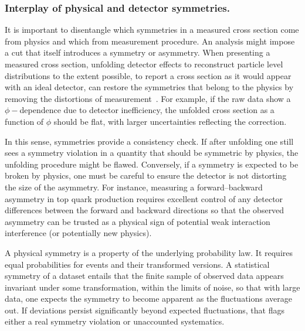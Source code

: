         \subsubsection{Interplay of physical and detector symmetries.}
            It is important to disentangle which symmetries in a measured cross section come from physics and which from measurement procedure.
            An analysis might impose a cut that itself introduces a symmetry or asymmetry.
            When presenting a measured cross section, unfolding detector effects to reconstruct particle level distributions to the extent possible, to report a cross section as it would appear with an ideal detector, can restore the symmetries that belong to the physics by removing the distortions of measurement~\cite{DAgostini:265717}.
            For example, if the raw data show a $\phi-$dependence due to detector inefficiency, the unfolded cross section as a function of $\phi$ should be flat, with larger uncertainties reflecting the correction.
            
            In this sense, symmetries provide a consistency check.
            If after unfolding one still sees a symmetry violation in a quantity that should be symmetric by physics, the unfolding procedure might be flawed.
            Conversely, if a symmetry is expected to be broken by physics, one must be careful to ensure the detector is not distorting the size of the asymmetry.
            For instance, measuring a forward--backward asymmetry in top quark production requires excellent control of any detector differences between the forward and backward directions so that the observed asymmetry can be trusted as a physical sign of potential weak interaction interference (or potentially new physics).

            A physical symmetry is a property of the underlying probability law.
            It requires equal probabilities for events and their transformed versions.
            A statistical symmetry of a dataset entails that the finite sample of observed data appears invariant under some transformation, within the limits of noise, so that with large data, one expects the symmetry to become apparent as the fluctuations average out.
            If deviations persist significantly beyond expected fluctuations, that flags either a real symmetry violation or unaccounted systematics.
            

